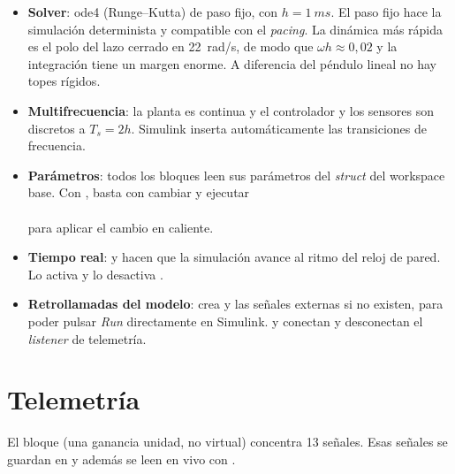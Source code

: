 \begin{itemize}
  \item \textbf{Solver}: ode4 (Runge--Kutta) de paso fijo, con $h=\SI{1}{ms}$. El paso fijo hace la simulación determinista y compatible con el \emph{pacing}. La dinámica más rápida es el polo del lazo cerrado en \SI{22}{rad/s}, de modo que $\omega h\approx0{,}02$ y la integración tiene un margen enorme. A diferencia del péndulo lineal no hay topes rígidos.
  \item \textbf{Multifrecuencia}: la planta es continua y el controlador y los sensores son discretos a $T_s=2h$. Simulink inserta automáticamente las transiciones de frecuencia.
  \item \textbf{Parámetros}: todos los bloques leen sus parámetros del \emph{struct}  del workspace base. Con , basta con cambiar  y ejecutar\\ \\ para aplicar el cambio en caliente.
  \item \textbf{Tiempo real}:  y  hacen que la simulación avance al ritmo del reloj de pared. Lo activa  y lo desactiva .
  \item \textbf{Retrollamadas del modelo}:  crea  y las señales externas si no existen, para poder pulsar \emph{Run} directamente en Simulink.  y  conectan y desconectan el \emph{listener} de telemetría.
\end{itemize}

\section{Telemetría}

El bloque  (una ganancia unidad, no virtual) concentra 13 señales. Esas señales se guardan en  y además se leen en vivo con .

